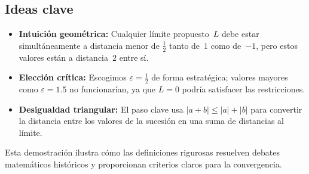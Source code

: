 \subsection{Ideas clave}

\begin{itemize}
  \item \textbf{Intuición geométrica:} Cualquier límite propuesto~$L$ debe
        estar simultáneamente a distancia menor de $\tfrac{1}{2}$ tanto de~$1$
        como de~$-1$, pero estos valores están a distancia~$2$ entre sí.

  \item \textbf{Elección crítica:} Escogimos $\varepsilon = \tfrac{1}{2}$
        de forma estratégica; valores mayores como $\varepsilon = 1.5$ no
        funcionarían, ya que $L = 0$ podría satisfacer las restricciones.

  \item \textbf{Desigualdad triangular:} El paso clave usa
        $|a + b| \leq |a| + |b|$ para convertir la distancia entre los valores
        de la sucesión en una suma de distancias al límite.
\end{itemize}

Esta demostración ilustra cómo las definiciones rigurosas resuelven debates
matemáticos históricos y proporcionan criterios claros para la convergencia.

